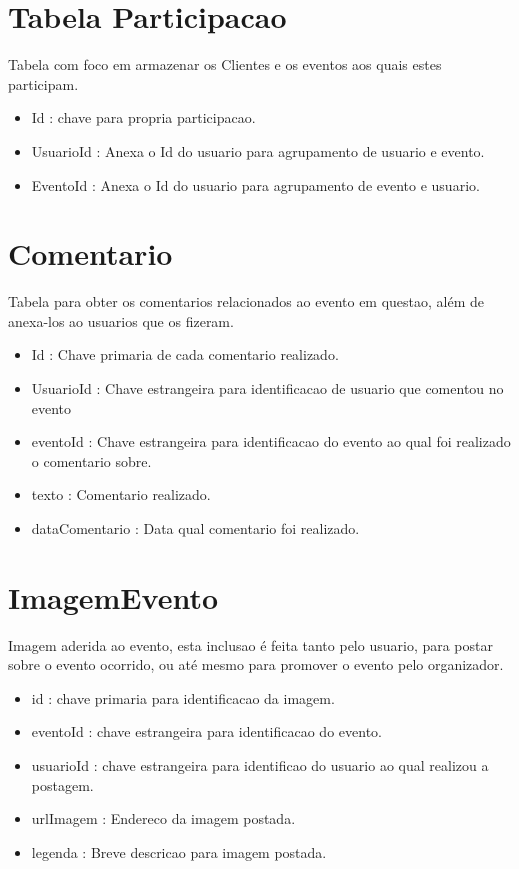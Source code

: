 \section{Tabela Participacao}
Tabela com foco em armazenar os Clientes e os eventos aos quais estes participam.
\begin{itemize}
    \item Id : chave para propria participacao.
    \item UsuarioId : Anexa o Id do usuario para agrupamento de usuario e evento.
    \item EventoId : Anexa o Id do usuario para agrupamento de evento e usuario.
\end{itemize}

\section{Comentario}
Tabela para obter os comentarios relacionados ao evento em questao, além de anexa-los ao usuarios que os fizeram.

\begin{itemize}
    \item Id : Chave primaria de cada comentario realizado.
    \item UsuarioId : Chave estrangeira para identificacao de usuario que comentou no evento
    \item eventoId : Chave estrangeira para identificacao do evento ao qual foi realizado o comentario sobre.
    \item texto : Comentario realizado.
    \item dataComentario : Data qual comentario foi realizado.
\end{itemize}

\section{ImagemEvento}
Imagem aderida ao evento, esta inclusao é feita tanto pelo usuario, para postar sobre o evento ocorrido, ou até mesmo para promover o evento pelo organizador.

\begin{itemize}
    \item id : chave primaria para identificacao da imagem.
    \item eventoId : chave estrangeira para identificacao do evento.
    \item usuarioId : chave estrangeira para identificao do usuario ao qual realizou a postagem.
    \item urlImagem : Endereco da imagem postada.
    \item legenda : Breve descricao para imagem postada.
\end{itemize}

